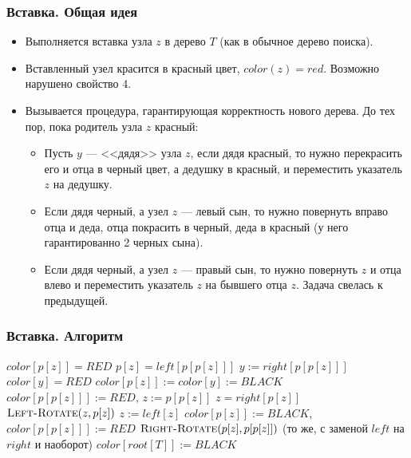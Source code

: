 \documentclass[hyperref={unicode=true}]{beamer}
\begin{document}
\frame
{
  \frametitle{Вставка. Общая идея}
  \begin{itemize}
    \item Выполняется вставка узла $z$ в дерево $T$ (как в обычное дерево поиска).
    \item Вставленный узел красится в красный цвет, $color(z) = red$. Возможно нарушено свойство 4.
    \item Вызывается процедура, гарантирующая корректность нового дерева. До тех пор, пока родитель узла $z$ красный:
      \begin{itemize}
        \item Пусть $y$ --- <<дядя>> узла $z$, если дядя красный, то нужно перекрасить его и отца в черный цвет, а дедушку в красный, и переместить указатель $z$ на дедушку.
        \item Если дядя черный, а узел $z$ --- левый сын, то нужно повернуть вправо отца и деда, отца покрасить в черный, деда в красный (у него гарантированно 2 черных сына).
        \item Если дядя черный, а узел $z$ --- правый сын, то нужно повернуть $z$ и отца влево и переместить указатель $z$ на бывшего отца $z$. Задача свелась к предыдущей.
      \end{itemize}
  \end{itemize}
}

\frame
{
  \frametitle{Вставка. Алгоритм}
  \begin{codebox}
      \li \While $color[p[z]] = RED$ 
      \li \Do \If $p[z] = left[p[p[z]]]$
      \li \Then $y := right[p[p[z]]]$
      \li \If $color[y] = RED$
      \li \Then $color[p[z]] :=  color[y] := BLACK$ 
      \li       $color[p[p[z]]] := RED$, $z := p[p[z]]$       
      \li \Else \If $z = right[p[z]]$
      \li   \Then $\textnormal{\scshape Left-Rotate}(z, p[z])$
      \li         $z := left[z]$ \End
      \li   $color[p[z]] := BLACK$, $color[p[p[z]]] := RED$   
      \li   $\textnormal{\scshape Right-Rotate}(p[z], p[p[z]])$ \End
      \li   \Else (то же, с заменой $left$ на $right$ и наоборот) \End \End
      \li $color[root[T]] := BLACK$
  
  \end{codebox}
}
\end{document}

